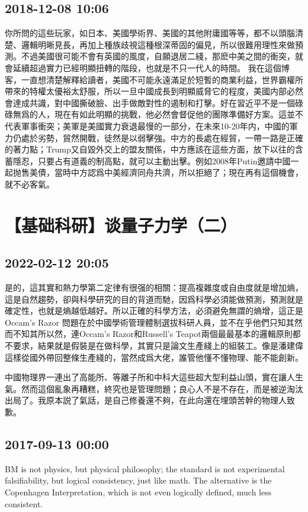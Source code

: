 \documentclass[twocolumn]{ctexart}
\begin{document}
\subsection*{2018-12-08 10:06}

你所問的這些玩家，如日本、美國學術界、美國的其他附庸國等等，都不以頭腦清楚、邏輯明晰見長，再加上種族歧視這種根深蒂固的偏見，所以很難用理性來做預測。不過美國很可能不會有英國的風度，自願退居二綫，那麽中美之間的衝突，就會延續超過實力已經明顯扭轉的階段，也就是不只一代人的時間。 
我在這個博客，一直想清楚解釋給讀者，美國不可能永遠滿足於短暫的商業利益，世界霸權所帶來的特權太優裕太舒服，所以一旦中國成長到明顯威脅它的程度，美國内部必然會達成共識，對中國撕破臉、出手做敵對性的遏制和打擊。好在習近平不是一個碌碌無爲的人，現在有如此明顯的挑戰，他必然會督促他的團隊準備好方案。這並不代表軍事衝突；美軍是美國實力衰退最慢的一部分，在未來10-20年内，中國的軍力仍處於劣勢，貿然開戰，徒然是以弱擊強。中方的長處在經貿，一帶一路是正確的著力點；Trump又自毀外交上的盟友關係，中方應該在這些方面，放下以往的含蓄隱忍，只要占有道義的制高點，就可以主動出擊。例如2008年Putin邀請中國一起抛售美債，當時中方認爲中美經濟同舟共濟，所以拒絕了；現在再有這個機會，就不必客氣。
\section*{【基础科研】谈量子力学（二）}
\subsection*{2022-02-12 20:05}

是的，這其實和熱力學第二定律有很强的相關：提高複雜度或自由度就是增加熵，這是自然趨勢，卻與科學研究的目的背道而馳，因爲科學必須能做預測，預測就是確定性，也就是熵越低越好。所以正確的科學方法，必須避免無謂的熵增，這正是Occam's Razor
問題在於中國學術管理體制選拔科研人員，並不在乎他們只知其然而不知其所以然，連Occam's Razor和Russell's Teapot兩個最最基本的邏輯原則都不要求，結果就是假裝是在做科學，其實只是論文生產綫上的組裝工。像是潘建偉這樣從國外帶回整條生產綫的，當然成爲大佬，誰管他懂不懂物理、能不能創新。

中國物理界一連出了高能所、等離子所和中科大這些超大型利益山頭，實在讓人生氣。然而這個亂象再糟糕，終究也是管理問題；良心人不是不存在，而是被逆淘汰出局了。我原本説了氣話，是自己修養還不夠，在此向還在埋頭苦幹的物理人致歉。
\subsection*{2017-09-13 00:00}
BM is not physics, but physical philosophy; the standard is not experimental falsifiability, but logical consistency, just like math. The alternative is the Copenhagen Interpretation, which is not even logically defined, much less consistent.
\end{document}
